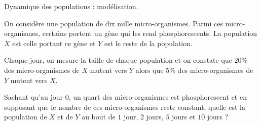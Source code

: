
\begin{exercice}\label{exoTD3-0006}

	Dynamique des populations : modélisation.

	On considère une population de dix mille micro-organismes. Parmi ces micro-organismes, certains portent un gène qui les rend phosphorescents. La population $X$ est celle portant ce gène et $Y$ est le reste de la population.

	Chaque jour, on mesure la taille de chaque population et on constate que $20\%$ des micro-organismes de $X$ mutent vers $Y$ alors que $5\%$ des micro-organismes de $Y$ mutent vers $X$.

	Sachant qu'au jour $0$, un quart des micro-organismes est phosphorescent et en supposant que le nombre de ces micro-organismes reste constant, quelle est la population de $X$ et de $Y$ au bout de $1$ jour, $2$ jours, $5$ jours et $10$ jours ?

\end{exercice}
